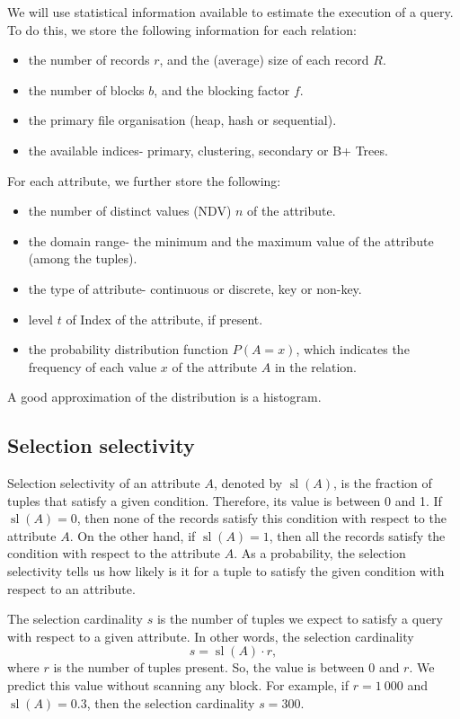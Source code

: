 \documentclass[a4paper, openany]{memoir}
\theoremstyle{definition}
\theoremstyle{plain}
\begin{document}
We will use statistical information available to estimate the execution of a query. To do this, we store the following information for each relation:
\begin{itemize}
    \item the number of records $r$, and the (average) size of each record $R$.
    \item the number of blocks $b$, and the blocking factor $f$.
    \item the primary file organisation (heap, hash or sequential).
    \item the available indices- primary, clustering, secondary or B+ Trees.
\end{itemize}
For each attribute, we further store the following:
\begin{itemize}
    \item the number of distinct values (NDV) $n$ of the attribute.
    \item the domain range- the minimum and the maximum value of the attribute (among the tuples).
    \item the type of attribute- continuous or discrete, key or non-key.
    \item level $t$ of Index of the attribute, if present.
    \item the probability distribution function $P(A = x)$, which indicates the frequency of each value $x$ of the attribute $A$ in the relation.
\end{itemize}
A good approximation of the distribution is a histogram.

\subsection{Selection selectivity}
Selection selectivity of an attribute $A$, denoted by $\operatorname{sl}(A)$, is the fraction of tuples that satisfy a given condition. Therefore, its value is between 0 and 1. If $\operatorname{sl}(A) = 0$, then none of the records satisfy this condition with respect to the attribute $A$. On the other hand, if $\operatorname{sl}(A) = 1$, then all the records satisfy the condition with respect to the attribute $A$. As a probability, the selection selectivity tells us how likely is it for a tuple to satisfy the given condition with respect to an attribute.

The selection cardinality $s$ is the number of tuples we expect to satisfy a query with respect to a given attribute. In other words, the selection cardinality
\[s = \operatorname{sl}(A) \cdot r,\]
where $r$ is the number of tuples present. So, the value is between 0 and $r$. We predict this value without scanning any block. For example, if $r = 1 \ 000$ and $\operatorname{sl}(A) = 0.3$, then the selection cardinality $s = 300$. 
\end{document}
